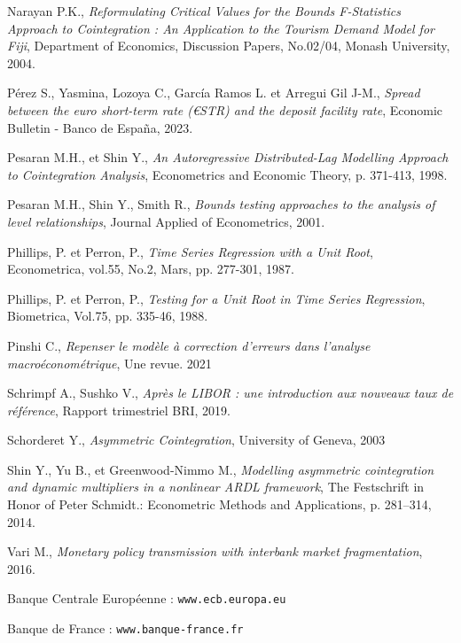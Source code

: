 \begin{thebibliography}{MMM99}
Narayan P.K.,
\textit{Reformulating Critical Values for the Bounds F-Statistics
Approach to Cointegration : An Application to the Tourism Demand Model for Fiji}, 
Department of Economics, Discussion Papers, No.02/04, Monash University, 2004.

Pérez S., Yasmina, Lozoya C., García Ramos L. et Arregui Gil J-M.,
\textit{Spread between the euro short-term rate (€STR) and the deposit facility rate}, Economic Bulletin - Banco de España, 2023.

Pesaran M.H., et Shin Y.,
\textit{An Autoregressive Distributed-Lag Modelling
Approach to Cointegration Analysis},
Econometrics and Economic Theory, p. 371-413, 1998.

Pesaran M.H., Shin Y., Smith R.,
\textit{Bounds testing approaches to the analysis of level relationships},
Journal Applied of Econometrics, 2001.

Phillips, P. et Perron, P.,
\textit{ Time Series Regression with a Unit Root},
Econometrica, vol.55, No.2, Mars, pp. 277-301, 1987.

Phillips, P. et Perron, P.,
\textit{Testing for a Unit Root in Time Series Regression},
Biometrica, Vol.75, pp. 335-46, 1988.

Pinshi C., 
\textit{Repenser le modèle à correction d’erreurs dans l’analyse macroéconométrique}, 
Une revue. 2021

Schrimpf A., Sushko V.,
\textit{Après le LIBOR : une introduction aux nouveaux taux
de référence}, Rapport trimestriel BRI, 2019.

Schorderet Y., 
\textit{Asymmetric Cointegration},
University of Geneva, 2003

Shin Y., Yu B., et Greenwood-Nimmo M.,
\textit{Modelling asymmetric cointegration and dynamic multipliers in a nonlinear ARDL framework}, 
The Festschrift in Honor of Peter Schmidt.: Econometric Methods and Applications, p. 281–314, 2014.

Vari M., 
\textit{Monetary policy transmission with interbank market fragmentation}, 
2016.

\newblock

Banque Centrale Européenne : \texttt{www.ecb.europa.eu}

Banque de France : \texttt{www.banque-france.fr}

\end{thebibliography}
